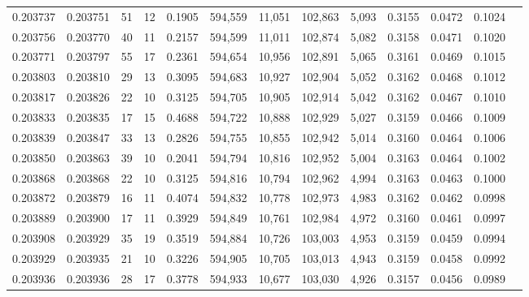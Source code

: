 \begin{tabular}{rrrrrrrrrrrrr}
0.203737 & 0.203751 &    51 &  12 &                                     0.1905 & 594,559 &  11,051 & 102,863 &   5,093 & 0.3155 & 0.0472 & 0.1024 \\
0.203756 & 0.203770 &    40 &  11 &                                     0.2157 & 594,599 &  11,011 & 102,874 &   5,082 & 0.3158 & 0.0471 & 0.1020 \\
0.203771 & 0.203797 &    55 &  17 &                                     0.2361 & 594,654 &  10,956 & 102,891 &   5,065 & 0.3161 & 0.0469 & 0.1015 \\
0.203803 & 0.203810 &    29 &  13 &                                     0.3095 & 594,683 &  10,927 & 102,904 &   5,052 & 0.3162 & 0.0468 & 0.1012 \\
0.203817 & 0.203826 &    22 &  10 &                                     0.3125 & 594,705 &  10,905 & 102,914 &   5,042 & 0.3162 & 0.0467 & 0.1010 \\
0.203833 & 0.203835 &    17 &  15 &                                     0.4688 & 594,722 &  10,888 & 102,929 &   5,027 & 0.3159 & 0.0466 & 0.1009 \\
0.203839 & 0.203847 &    33 &  13 &                                     0.2826 & 594,755 &  10,855 & 102,942 &   5,014 & 0.3160 & 0.0464 & 0.1006 \\
0.203850 & 0.203863 &    39 &  10 &                                     0.2041 & 594,794 &  10,816 & 102,952 &   5,004 & 0.3163 & 0.0464 & 0.1002 \\
0.203868 & 0.203868 &    22 &  10 &                                     0.3125 & 594,816 &  10,794 & 102,962 &   4,994 & 0.3163 & 0.0463 & 0.1000 \\
0.203872 & 0.203879 &    16 &  11 &                                     0.4074 & 594,832 &  10,778 & 102,973 &   4,983 & 0.3162 & 0.0462 & 0.0998 \\
0.203889 & 0.203900 &    17 &  11 &                                     0.3929 & 594,849 &  10,761 & 102,984 &   4,972 & 0.3160 & 0.0461 & 0.0997 \\
0.203908 & 0.203929 &    35 &  19 &                                     0.3519 & 594,884 &  10,726 & 103,003 &   4,953 & 0.3159 & 0.0459 & 0.0994 \\
0.203929 & 0.203935 &    21 &  10 &                                     0.3226 & 594,905 &  10,705 & 103,013 &   4,943 & 0.3159 & 0.0458 & 0.0992 \\
0.203936 & 0.203936 &    28 &  17 &                                     0.3778 & 594,933 &  10,677 & 103,030 &   4,926 & 0.3157 & 0.0456 & 0.0989 \\

\end{tabular}
